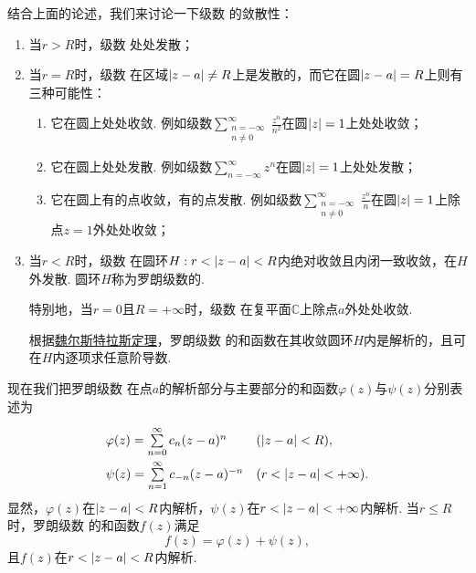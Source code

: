 结合上面的论述，我们来讨论一下级数 的敛散性：
\begin{enumerate}
\item 当\(r > R\)时，级数 处处发散；

\item 当\(r = R\)时，级数 在区域\(\abs{z-a} \neq R\)上是发散的，而它在圆\(\abs{z-a}=R\)上则有三种可能性：\begin{enumerate}
\item 它在圆上处处收敛.
例如级数\(\sum\limits_{\substack{n=-\infty \\ n\neq0}}^{\infty} \frac{z^n}{n^2}\)在圆\(\abs{z}=1\)上处处收敛；

\item 它在圆上处处发散.
例如级数\(\sum\limits_{n=-\infty}^{\infty} z^n\)在圆\(\abs{z}=1\)上处处发散；

\item 它在圆上有的点收敛，有的点发散.
例如级数\(\sum\limits_{\substack{n=-\infty \\ n\neq0}}^{\infty} \frac{z^n}{n}\)在圆\(\abs{z}=1\)上除点\(z=1\)外处处收敛；
\end{enumerate}

\item 当\(r < R\)时，级数 在圆环\(H: r < \abs{z-a} < R\)内绝对收敛且内闭一致收敛，在\(H\)外发散.
圆环\(H\)称为罗朗级数的.

特别地，当\(r = 0\)且\(R = +\infty\)时，级数 在复平面\(\mathbb{C}\)上除点\(a\)外处处收敛.

根据\hyperref[theorem:解析函数的级数表示.魏尔斯特拉斯定理]{魏尔斯特拉斯定理}，罗朗级数 的和函数在其收敛圆环\(H\)内是解析的，且可在\(H\)内逐项求任意阶导数.
\end{enumerate}

现在我们把罗朗级数 在点\(a\)的解析部分与主要部分的和函数\(\varphi(z)\)与\(\psi(z)\)分别表述为\[
\def\arraystretch{2}
\begin{array}{ll}
\varphi(z) = \sum\limits_{n=0}^{\infty} c_n (z-a)^n & (\abs{z-a}<R), \\
\psi(z) = \sum\limits_{n=1}^{\infty} c_{-n} (z-a)^{-n} & (r < \abs{z-a} < +\infty).
\end{array}
\]显然，\(\varphi(z)\)在\(\abs{z-a}<R\)内解析，\(\psi(z)\)在\(r<\abs{z-a}<+\infty\)内解析.
当\(r \leqslant R\)时，罗朗级数 的和函数\(f(z)\)满足\[
f(z) = \varphi(z) + \psi(z),
\]且\(f(z)\)在\(r<\abs{z-a}<R\)内解析.

